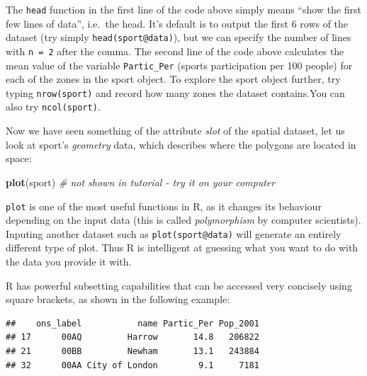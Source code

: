 \documentclass[]{article}
\newenvironment{Shaded}{}{}
\newcommand{\KeywordTok}[1]{\textcolor[rgb]{0.00,0.44,0.13}{\textbf{{#1}}}}
\newcommand{\DecValTok}[1]{\textcolor[rgb]{0.25,0.63,0.44}{{#1}}}
\newcommand{\StringTok}[1]{\textcolor[rgb]{0.25,0.44,0.63}{{#1}}}
\newcommand{\CommentTok}[1]{\textcolor[rgb]{0.38,0.63,0.69}{\textit{{#1}}}}
\newcommand{\NormalTok}[1]{{#1}}
\begin{document}
The \texttt{head} function in the first line of the code above simply
means ``show the first few lines of data'', i.e.~the head. It's default
is to output the first 6 rows of the dataset (try simply
\texttt{head(sport@data)}), but we can specify the number of lines with
\texttt{n = 2} after the comma. The second line of the code above
calculates the mean value of the variable \texttt{Partic\_Per} (sports
participation per 100 people) for each of the zones in the sport object.
To explore the sport object further, try typing \texttt{nrow(sport)} and
record how many zones the dataset contains.You can also try
\texttt{ncol(sport)}.

Now we have seen something of the attribute \emph{slot} of the spatial
dataset, let us look at sport's \emph{geometry} data, which describes
where the polygons are located in space:

\begin{Shaded}
\begin{Highlighting}[]
\KeywordTok{plot}\NormalTok{(sport)  }\CommentTok{# not shown in tutorial - try it on your computer}
\end{Highlighting}
\end{Shaded}

\texttt{plot} is one of the most useful functions in R, as it changes
its behaviour depending on the input data (this is called
\emph{polymorphism} by computer scientists). Inputing another dataset
such as \texttt{plot(sport@data)} will generate an entirely different
type of plot. Thus R is intelligent at guessing what you want to do with
the data you provide it with.

R has powerful subsetting capabilities that can be accessed very
concisely using square brackets, as shown in the following example:

\begin{Shaded}
\end{Shaded}

\begin{verbatim}
##    ons_label           name Partic_Per Pop_2001
## 17      00AQ         Harrow       14.8   206822
## 21      00BB         Newham       13.1   243884
## 32      00AA City of London        9.1     7181
\end{verbatim}
\end{document}
